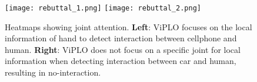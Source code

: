 \documentclass[10pt,twocolumn,letterpaper]{article}
\begin{document}
\begin{figure}[t]
\begin{center}

\texttt{[image: rebuttal\_1.png]}
\texttt{[image: rebuttal\_2.png]}

\end{center}
\vspace{-5mm}
  \caption{Heatmaps showing joint attention. \textbf{Left}: ViPLO focuses on the local information of hand to detect interaction between cellphone and human. \textbf{Right}:  ViPLO does not focus on a specific joint for local information when detecting interaction between car and human, resulting in no-interaction.}
\vspace{-1mm}
\label{fig:qualitative}
\end{figure} 
\end{document}
